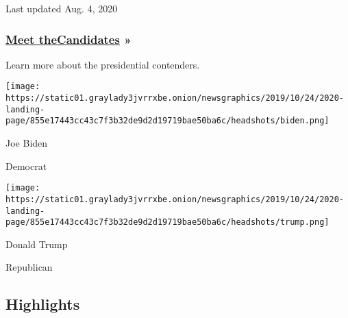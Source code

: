 Last updated Aug. 4, 2020

\hypertarget{meet-thecandidates-}{%
\subsubsection{\texorpdfstring{\href{https://www.nytimes3xbfgragh.onion/interactive/2019/us/politics/2020-presidential-candidates.html}{Meet
the}\href{https://www.nytimes3xbfgragh.onion/interactive/2019/us/politics/2020-presidential-candidates.html}{C}\href{https://www.nytimes3xbfgragh.onion/interactive/2019/us/politics/2020-presidential-candidates.html}{andidates}
»}{Meet theCandidates »}}\label{meet-thecandidates-}}

Learn more about the presidential contenders.

\href{https://www.nytimes3xbfgragh.onion/interactive/2020/us/elections/joe-biden.html}{}

\texttt{[image: https://static01.graylady3jvrrxbe.onion/newsgraphics/2019/10/24/2020-landing-page/855e17443cc43c7f3b32de9d2d19719bae50ba6c/headshots/biden.png]}

Joe Biden

Democrat

\href{https://www.nytimes3xbfgragh.onion/interactive/2020/us/elections/donald-trump.html}{}

\texttt{[image: https://static01.graylady3jvrrxbe.onion/newsgraphics/2019/10/24/2020-landing-page/855e17443cc43c7f3b32de9d2d19719bae50ba6c/headshots/trump.png]}

Donald Trump

Republican

\hypertarget{highlights}{%
\subsection{Highlights}\label{highlights}}

